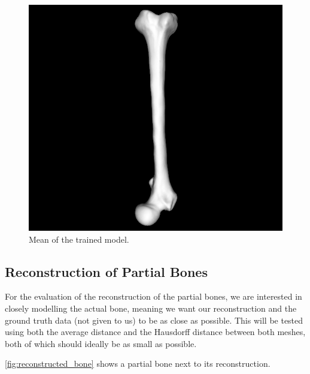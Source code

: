 \begin{figure}
	\centering
  \includegraphics[scale=0.7]{./Figures/trained_model}
  \caption{Mean of the trained model.}
  \label{fig:trained_model}
\end{figure}


\subsection{Reconstruction of Partial Bones}
\label{subsec:reconresults}
For the evaluation of the reconstruction of the partial bones, we are interested in closely modelling the actual bone, meaning we want our reconstruction and the ground truth data (not given to us) to be as close as possible. 
This will be tested using both the average distance and the Hausdorff distance between both meshes, both of which should ideally be as small as possible.

\autoref{fig:reconstructed_bone} shows a partial bone next to its reconstruction.

